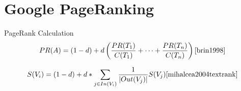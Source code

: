 \documentclass[10pt]{beamer}
\begin{document}
\section{Google PageRanking}
\begin{frame}{PageRank Calculation}
  \begin{equation*}
	PR(A) = (1-d) + d \left(\frac{PR(T_1)}{C(T_1)} + \cdots + \frac{PR(T_n)}{C(T_n)}\right) \cite{brin1998}
  \end{equation*}
  
  \begin{equation*}
    S(V_i) = (1 - d) + d * \sum_{j\in In(V_i)} \frac{1}{\lvert Out(V_j)\rvert}S(V_j)\cite{mihalcea2004textrank}
  \end{equation*}
\end{frame}
\end{document}
